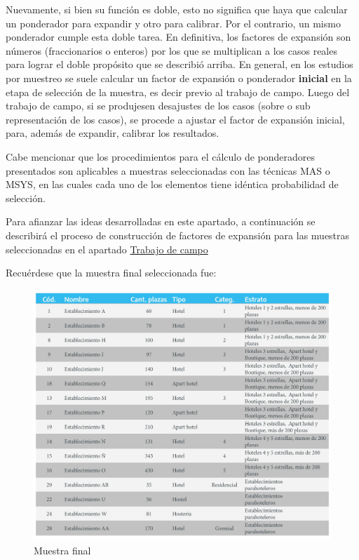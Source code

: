 \documentclass[
]{book}
\begin{document}
Nuevamente, si bien su función es doble, esto no significa que haya que calcular un ponderador para expandir y otro para calibrar. Por el contrario, un mismo ponderador cumple esta doble tarea. En definitiva, los factores de expansión son números (fraccionarios o enteros) por los que se multiplican a los casos reales para lograr el doble propósito que se describió arriba. En general, en los estudios por muestreo se suele calcular un factor de expansión o ponderador \textbf{inicial} en la etapa de selección de la muestra, es decir previo al trabajo de campo. Luego del trabajo de campo, si se produjesen desajustes de los casos (sobre o sub representación de los casos), se procede a ajustar el factor de expansión inicial, para, además de expandir, calibrar los resultados.

Cabe mencionar que los procedimientos para el cálculo de ponderadores presentados son aplicables a muestras seleccionadas con las técnicas MAS o MSYS, en las cuales cada uno de los elementos tiene idéntica probabilidad de selección.

Para afianzar las ideas desarrolladas en este apartado, a continuación se describirá el proceso de construcción de factores de expansión para las muestras seleccionadas en el apartado \protect\hyperlink{trabajo-de-campo}{Trabajo de campo}

Recuérdese que la muestra final seleccionada fue:

\begin{figure}

{\centering \includegraphics[width=1\linewidth]{imagenes/tabla_7a} 

}

\caption{Muestra final}\label{fig:tabla-7a}
\end{figure}
\end{document}
